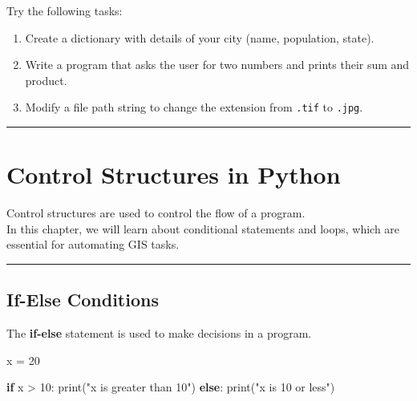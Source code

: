 \documentclass[
  11pt,
  letterpaper,
]{book}
\newenvironment{Shaded}{\begin{snugshade}}{\end{snugshade}}
\newcommand{\BuiltInTok}[1]{\textcolor[rgb]{0.00,0.23,0.31}{#1}}
\newcommand{\ControlFlowTok}[1]{\textcolor[rgb]{0.00,0.23,0.31}{\textbf{#1}}}
\newcommand{\DecValTok}[1]{\textcolor[rgb]{0.68,0.00,0.00}{#1}}
\newcommand{\NormalTok}[1]{\textcolor[rgb]{0.00,0.23,0.31}{#1}}
\newcommand{\OperatorTok}[1]{\textcolor[rgb]{0.37,0.37,0.37}{#1}}
\newcommand{\StringTok}[1]{\textcolor[rgb]{0.13,0.47,0.30}{#1}}
\providecommand{\tightlist}{%
  \setlength{\itemsep}{0pt}\setlength{\parskip}{0pt}}
\begin{document}
Try the following tasks:

\begin{enumerate}
\def\labelenumi{\arabic{enumi}.}
\tightlist
\item
  Create a dictionary with details of your city (name, population,
  state).\\
\item
  Write a program that asks the user for two numbers and prints their
  sum and product.\\
\item
  Modify a file path string to change the extension from \texttt{.tif}
  to \texttt{.jpg}.
\end{enumerate}

\begin{center}\rule{0.5\linewidth}{0.5pt}\end{center}

\chapter{Control Structures in
Python}\label{control-structures-in-python}

Control structures are used to control the flow of a program.\\
In this chapter, we will learn about conditional statements and loops,
which are essential for automating GIS tasks.

\begin{center}\rule{0.5\linewidth}{0.5pt}\end{center}

\section{If-Else Conditions}\label{if-else-conditions}

The \textbf{if-else} statement is used to make decisions in a program.

\begin{Shaded}
\begin{Highlighting}[]
\NormalTok{x }\OperatorTok{=} \DecValTok{20}

\ControlFlowTok{if}\NormalTok{ x }\OperatorTok{\textgreater{}} \DecValTok{10}\NormalTok{:}
    \BuiltInTok{print}\NormalTok{(}\StringTok{"x is greater than 10"}\NormalTok{)}
\ControlFlowTok{else}\NormalTok{:}
    \BuiltInTok{print}\NormalTok{(}\StringTok{"x is 10 or less"}\NormalTok{)}
\end{Highlighting}
\end{Shaded}
\end{document}
